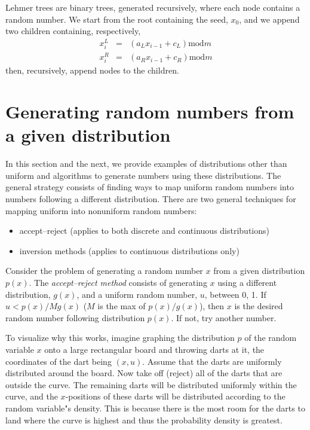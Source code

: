 \documentclass[justified, sixbynine]{tufte-book}
\theoremstyle{plain}%
\newtheorem * {corollary}{Corollary}
\theoremstyle{definition}
\theoremstyle{remark}
\newtheorem * {remark}{Remark}
\newtheorem * {note}{Note}
\begin{document}
\begin{fullwidth}
Lehmer trees are binary trees, generated recursively, where each node
contains a random number. We start from the root containing the seed, $x_0$, and
we append two children containing, respectively, 
\begin{eqnarray}
x_i^L &=&(a_Lx_{i-1}+c_L)\textrm{mod}m \\
x_i^R &=&(a_Rx_{i-1}+c_R)\textrm{mod}m
\end{eqnarray}
then, recursively, append nodes to the children.

\goodbreak\section{Generating random numbers from a given distribution}


In this section and the next, we provide examples of distributions other than uniform and algorithms to generate numbers using these distributions. The general strategy consists of finding ways to map uniform random numbers into numbers following a different distribution. There are two general techniques for mapping uniform into nonuniform random numbers:

\begin{itemize}
\item accept--reject (applies to both discrete and continuous distributions)
\item inversion methods (applies to continuous distributions only)
\end{itemize}

Consider the problem of generating a random number $x$ from a given distribution $p(x)$. The {\it accept--reject method} consists of generating $x$ using a different distribution, $g(x)$, and a uniform random number, $u$, between 0, 1. If $u<p(x)/Mg(x)$ ($M$ is the max of $p(x)/g(x)$), then $x$ is the desired random number following distribution $p(x)$. If not, try another number.

To visualize why this works, imagine graphing the distribution $p$ of the random variable $x$ onto a large rectangular board and throwing darts at it, the coordinates of the dart being $(x, u)$. Assume that the darts are uniformly distributed around the board. Now take off (reject) all of the darts that are outside the curve. The remaining darts will be distributed uniformly within the curve, and the $x$-positions of these darts will be distributed according to the random variable"s density. This is because there is the most room for the darts to land where the curve is highest and thus the probability density is greatest.


\end{fullwidth}
\end{document}
